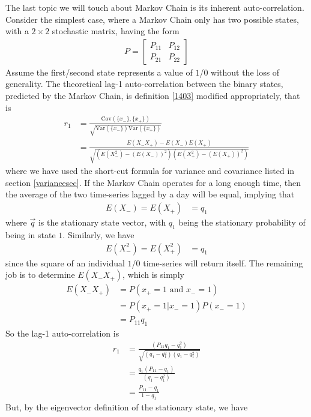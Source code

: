 The last topic we will touch about Markov Chain is its inherent auto-correlation. Consider the simplest case, where a Markov Chain only has two possible states, with a $2 \times 2$ stochastic matrix, having the form
\begin{align*}
P = 
\begin{bmatrix}
P_{11} & P_{12} \\
P_{21} & P_{22}
\end{bmatrix}
\end{align*}
Assume the first/second state represents a value of $1$/$0$ without the loss of generality. The theoretical lag-1 auto-correlation between the binary states, predicted by the Markov Chain, is definition \ref{1403} modified appropriately, that is
\begin{align*}
r_1 &= \frac{\text{Cov}(\{x_{-}\},\{x_{+}\})}{\sqrt{\text{Var}(\{x_{-}\}) \text{Var}(\{x_{+}\})}} \\
&= \frac{E(X_{-}X_{+}) - E(X_{-})E(X_{+})}{\sqrt{(E(X_{-}^2) - (E(X_{-}))^2)(E(X_{+}^2) - (E(X_{+}))^2)}}
\end{align*}
where we have used the short-cut formula for variance and covariance listed in section \ref{variancesec}. If the Markov Chain operates for a long enough time, then the average of the two time-series lagged by a day will be equal, implying that
\begin{align*}
E(X_{-}) = E(X_{+}) &= q_1
\end{align*}
where $\vec{q}$ is the stationary state vector, with $q_1$ being the stationary probability of being in state $1$. Similarly, we have
\begin{align*}
E(X_{-}^2) = E(X_{+}^2) &= q_1    
\end{align*}
since the square of an individual $1$/$0$ time-series will return itself. The remaining job is to determine $E(X_{-}X_{+})$, which is simply
\begin{align*}
E(X_{-}X_{+}) &= P(x_{+}=1 \text{ and } x_{-}=1) \\
&= P(x_{+}=1|x_{-}=1) P(x_{-}=1) \\
&= P_{11} q_1
\end{align*}
So the lag-1 auto-correlation is
\begin{align*}
r_1 &= \frac{(P_{11}q_1-q_1^2)}{\sqrt{(q_1-q_1^2)(q_1-q_1^2)}} \\
&= \frac{q_1(P_{11}-q_1)}{(q_1-q_1^2)} \\
&= \frac{P_{11}-q_1}{1-q_1}
\end{align*}
But, by the eigenvector definition of the stationary state, we have
